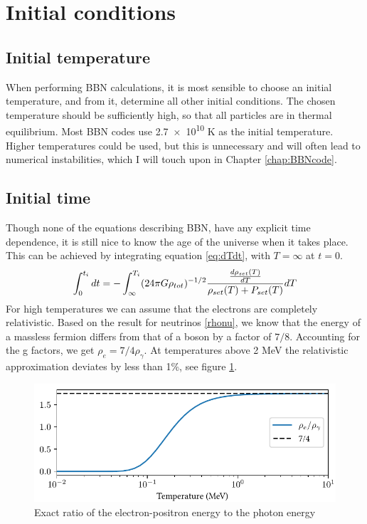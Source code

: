 \section{Initial conditions}

\subsection{Initial temperature}
When performing BBN calculations, it is most sensible to choose an initial temperature, and from it, determine all other initial conditions. The chosen temperature should be sufficiently high, so that all particles are in thermal equilibrium. Most BBN codes use \num{2.7e10} K as the initial temperature. Higher temperatures could be used, but this is unnecessary and will often lead to numerical instabilities, which I will touch upon in Chapter \ref{chap:BBNcode}.

\subsection{Initial time}

Though none of the equations describing BBN, have any explicit time dependence, it is still nice to know the age of the universe when it takes place. This can be achieved by integrating equation \eqref{eq:dTdt}, with $T=\infty$ at $t=0$.
\begin{align}
    \int_{0}^{t_i}dt=-\int_{\infty}^{T_i}(24\pi G\rho_{tot})^{-1/2}\frac{\frac{d\rho_{set}(T)}{dT}}{\rho_{set}(T) + P_{set}(T)}dT
\end{align}
For high temperatures we can assume that the electrons are completely relativistic. Based on the result for neutrinos \eqref{rhonu}, we know that the energy of a massless fermion differs from that of a boson by a factor of $7/8$. Accounting for the g factors, we get $\rho_e=7/4 \rho_\gamma$. At temperatures above 2 MeV the relativistic approximation deviates by less than 1\%, see figure \ref{fig:rhoegammaT}.
\begin{figure}[h!]
    \includegraphics[width=5.1in]{figures/rhoegammaT.pdf}
    \caption{Exact ratio of the electron-positron energy to the photon energy}
    \label{fig:rhoegammaT}
\end{figure}

